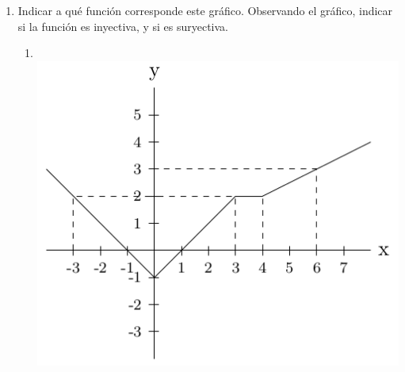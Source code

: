 \documentclass[a4paper]{article}
\newcommand{\exercise}{\item}
\begin{document}
\begin{enumerate}
\begin{enumerate} [label=(\alph*)]
		\item $\left\{\begin{matrix}2x-1 ~~~~ si ~~x\leq 1\\ ~~x^2~~ ~~~~~ si ~~x>1\end{matrix}\right.$
		\item $\left\{\begin{matrix}-x ~~~~ si ~~x\leq 0\\ ~x  ~~~~  si ~~0<x\leq 3 \\ -x ~~~~ si ~~x>3\end{matrix}\right.$
		\item $\left\{\begin{matrix}\hspace{-2mm}3x-2 ~~~ si ~~x\leq 2 ~~\\ \hspace{-2mm} ~~~~~ x^2 ~~~~~~  si ~~2<x\leq 3 \\ \hspace{-2mm}\displaystyle{\frac{x+6}{9}} ~~~ si ~~x>3 ~~\end{matrix}\right.$
		\item $\left\{\begin{matrix}x^2+7 ~~~~ si ~~x\leq 2\\ x+4 ~~~~~ si ~~x>2\end{matrix}\right.$
		\item $\sin(2x)$
		\item $\cos(x)+3$
		\item $2\arctan(x)$
		\item $\displaystyle{\frac{1}{2-\sqrt{x}}}$
		\item $\log_2(x^2)$
		\item $\exp(-x)=e^{-x}$
		\item $2^x$
	\end{enumerate}
	\exercise Indicar a qué función corresponde este gráfico. Observando el gráfico, indicar si la función es inyectiva, y si es suryectiva.
	\begin{enumerate} [label=(\alph*)]
		\item ~\\ [-15pt] \includegraphics[scale=0.5]{func1.png}

\end{enumerate}
\end{enumerate}
\end{document}
